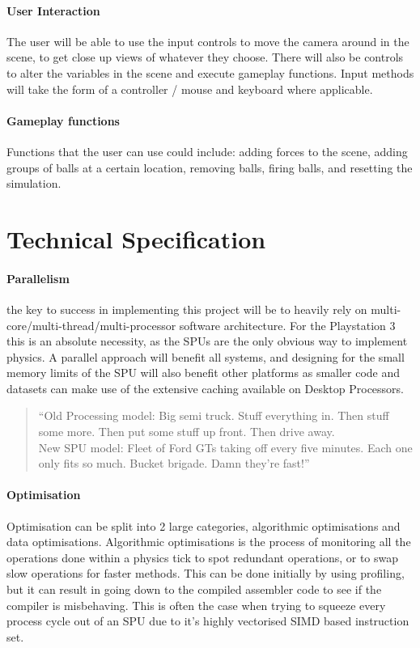 \documentclass[conference]{acmsiggraph}
\begin{document}
\paragraph{User Interaction}
The user will be able to use the input controls to move the camera around in the scene, to get close up views of whatever they choose. There will also be controls to alter the variables in the scene and execute gameplay functions. Input methods will take the form of a controller / mouse and keyboard where applicable.

\paragraph{Gameplay functions}
Functions that the user can use could include: adding forces to the scene, adding groups of balls at a certain location, removing balls, firing balls, and resetting the simulation.

\section{Technical Specification}

\paragraph{Parallelism}
the key to success in implementing this project will be to heavily rely on multi-core/multi-thread/multi-processor software architecture. For the Playstation 3 this is an absolute necessity, as the SPUs are the only obvious way to implement physics. A parallel approach will benefit all systems, and designing for the small memory limits of the SPU will also benefit other platforms as smaller code and datasets can make use of the extensive caching available on Desktop Processors.

\begin{quote}
``Old Processing model: Big semi truck. Stuff everything in. Then stuff some
more. Then put some stuff up front. Then drive
away.\\
New SPU model: Fleet of Ford GTs taking off every five minutes.
Each one only fits so much. Bucket brigade. Damn they're fast!''
 \cite{spuspeed}
\end{quote}

\paragraph{Optimisation}
Optimisation can be split into 2 large categories, algorithmic optimisations and data optimisations. Algorithmic optimisations is the process of monitoring all the operations done within a physics tick to spot redundant operations, or to swap slow operations for faster methods. This can be done initially by using profiling, but it can result in going down to the compiled assembler code to see if the compiler is misbehaving. This is often the case when trying to squeeze every process cycle out of an SPU due to it's highly vectorised SIMD based instruction set.
\end{document}
